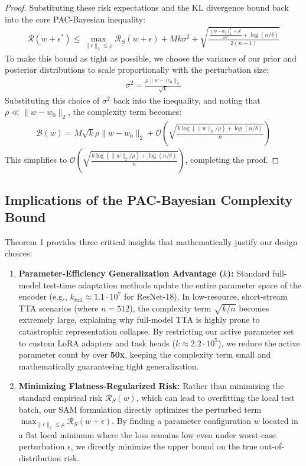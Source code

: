 \documentclass{article}
\theoremstyle{plain}
\theoremstyle{definition}
\theoremstyle{remark}
\begin{document}
\begin{proof}
Substituting these risk expectations and the KL divergence bound back into the core PAC-Bayesian inequality:
\begin{align}
    \mathcal{R}(w + \epsilon^*) \le \max_{\|\epsilon\|_2 \le \rho} \mathcal{R}_S(w + \epsilon) + M k \sigma^2 + \sqrt{\frac{\frac{\|w - w_0\|_2^2 + \rho^2}{\sigma^2} + \log(n/\delta)}{2(n - 1)}}
\end{align}
To make this bound as tight as possible, we choose the variance of our prior and posterior distributions to scale proportionally with the perturbation size:
\begin{align}
    \sigma^2 = \frac{\rho \| w - w_0 \|_2}{\sqrt{k}}
\end{align}
Substituting this choice of $\sigma^2$ back into the inequality, and noting that $\rho \ll \| w - w_0 \|_2$, the complexity term becomes:
\begin{align}
    \mathcal{B}(w) = M\sqrt{k}\rho \|w - w_0\|_2 + \mathcal{O}\left( \sqrt{\frac{k \log(\|w\|_2 / \rho) + \log(n/\delta)}{n}} \right)
\end{align}
This simplifies to $\mathcal{O}\left( \sqrt{\frac{k \log(\|w\|_2 / \rho) + \log(n/\delta)}{n}} \right)$, completing the proof.
\end{proof}

\subsection{Implications of the PAC-Bayesian Complexity Bound}
Theorem 1 provides three critical insights that mathematically justify our design choices:
\begin{enumerate}
    \item \textbf{Parameter-Efficiency Generalization Advantage ($k$):} Standard full-model test-time adaptation methods update the entire parameter space of the encoder (e.g., $k_{\text{full}} \approx 1.1 \cdot 10^7$ for ResNet-18). In low-resource, short-stream TTA scenarios (where $n = 512$), the complexity term $\sqrt{k/n}$ becomes extremely large, explaining why full-model TTA is highly prone to catastrophic representation collapse. By restricting our active parameter set to custom LoRA adapters and task heads ($k \approx 2.2 \cdot 10^5$), we reduce the active parameter count by over \textbf{50x}, keeping the complexity term small and mathematically guaranteeing tight generalization.
    \item \textbf{Minimizing Flatness-Regularized Risk:} Rather than minimizing the standard empirical risk $\mathcal{R}_S(w)$, which can lead to overfitting the local test batch, our SAM formulation directly optimizes the perturbed term $\max_{\|\epsilon\|_2 \le \rho} \mathcal{R}_S(w + \epsilon)$. By finding a parameter configuration $w$ located in a flat local minimum where the loss remains low even under worst-case perturbation $\epsilon$, we directly minimize the upper bound on the true out-of-distribution risk.
\end{enumerate}
\end{document}
